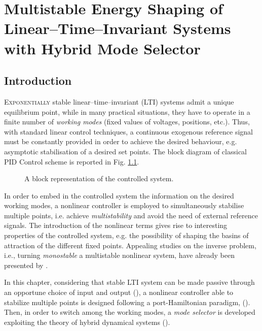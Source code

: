 %
\chapter{Multistable Energy Shaping of Linear--Time--Invariant Systems with Hybrid Mode Selector}

\label{chap:multistable}
\minitoc

\thispagestyle{empty}

\newpage
\section{Introduction}
\lettrine[lines=4]{\color{brickred}E}{xponentially} stable linear--time--invariant (LTI) systems admit a unique equilibrium point, while in many practical situations, they have to operate in a finite number of \textit{working modes} (fixed values of voltages, positions, etc.).
Thus, with standard linear control techniques, a continuous exogenous reference signal must be constantly provided in order to achieve the desired behaviour, e.g. asymptotic stabilisation of a desired set points. The block diagram of classical PID Control scheme is reported in Fig. \ref{fig:PID}.
%
\begin{figure}[!h]
	\centering
	\caption{A block representation of the controlled system.}
	\label{fig:PID}
\end{figure}
%
In order to embed in the controlled system the information on the desired working modes, a nonlinear controller is employed to simultaneously stabilise multiple points, i.e. achieve \textit{multistability} and avoid the need of external reference signals.
The introduction of the nonlinear terms gives rise to interesting properties of the controlled system, e.g. the possibility of shaping the basins of attraction of the different fixed points.
Appealing studies on the inverse problem, i.e., turning \textit{monostable} a {multistable} nonlinear system, have already been presented by \cite{PISARCHIK2014167}.

In this chapter, considering that stable LTI system can be made passive through an opportune choice of input and output (\cite{byrnes91}), a nonlinear controller able to stabilize multiple points is designed following a port-Hamiltonian paradigm, (\cite{876703,secchi2007control,ortega2008control,van2014port}). Then, in order to switch among the working modes, a \textit{mode selector} is developed exploiting the theory of hybrid dynamical systems (\cite{van2000introduction,goebel2008}).

